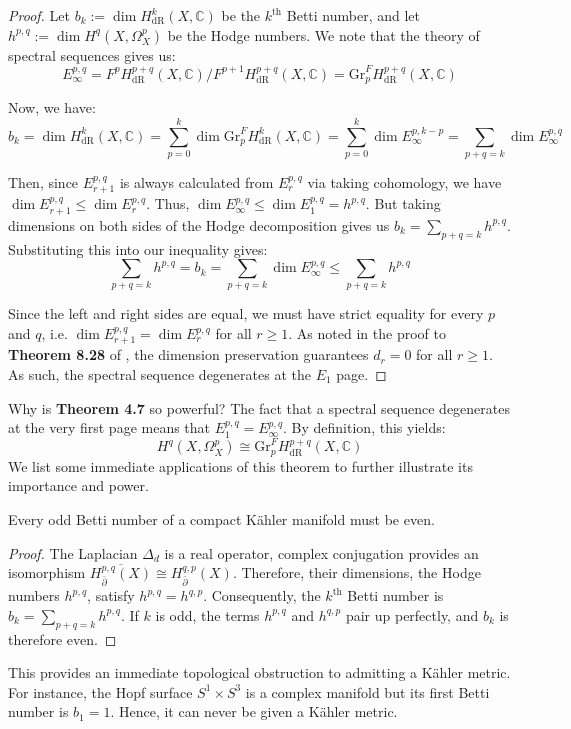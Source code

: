 \documentclass[11pt]{article}
\newcommand{\C}{\mathbb{C}}
\theoremstyle{definition}
\numberwithin{theorem}{section} %
\numberwithin{equation}{section} %
\begin{document}
\begin{proof}
        Let $b_k:=\dim H_\mathrm{dR}^k(X,\C)$ be the $k^\text{th}$ Betti number, and let $h^{p,q}:=\dim H^q\left(X,\Omega_X^p\right)$ be the Hodge numbers. We note that the theory of spectral sequences gives us:
        $$
        E_\infty^{p,q} = F^p H_\mathrm{dR}^{p+q}(X,\C) / F^{p+1} H_\mathrm{dR}^{p+q}(X,\C) = \mathrm{Gr}^F_p H_\mathrm{dR}^{p+q}(X,\C)
        $$
        
        \noindent Now, we have:
        $$
        b_k = \dim H_\mathrm{dR}^k(X,\C) = \sum_{p=0}^k\dim \mathrm{Gr}^F_p H_\mathrm{dR}^k(X,\C) = \sum_{p=0}^k\dim E^{p,k-p}_\infty = \sum_{p+q=k} \dim E_\infty^{p,q}
        $$
        
        \noindent Then, since $E_{r+1}^{p,q}$ is always calculated from $E_r^{p,q}$ via taking cohomology, we have $\dim E_{r+1}^{p,q} \leq \dim E_r^{p,q}$. Thus, $\dim E_\infty^{p,q} \leq \dim E_1^{p,q} = h^{p,q}$. But taking dimensions on both sides of the Hodge decomposition gives us $b_k = \sum_{p+q=k} h^{p,q}$. Substituting this into our inequality gives:
        $$
        \sum_{p+q=k} h^{p,q} = b_k = \sum_{p+q=k} \dim E_\infty^{p,q} \leq \sum_{p+q=k} h^{p,q}
        $$
        
        \noindent Since the left and right sides are equal, we must have strict equality for every $p$ and $q$, i.e. $\dim E_{r+1}^{p,q} = \dim E_r^{p,q}$ for all $r\geq 1$. As noted in the proof to \textbf{Theorem 8.28} of \cite{VoisinI2002}, the dimension preservation guarantees $d_r = 0$ for all $r\geq 1$. As such, the spectral sequence degenerates at the $E_1$ page.
\end{proof}

\noindent Why is \textbf{Theorem 4.7} so powerful? The fact that a spectral sequence degenerates at the very first page means that $E_1^{p,q} = E_\infty^{p,q}$. By definition, this yields:
$$
H^q\left(X,\Omega_X^p\right) \cong \mathrm{Gr}^F_p H^{p+q}_\mathrm{dR}(X,\C)
$$
We list some immediate applications of this theorem to further illustrate its importance and power. 

\begin{corollary}
    Every odd Betti number of a compact K\"ahler manifold must be even.
\end{corollary}

\begin{proof}
    The Laplacian $\Delta_d$ is a real operator, complex conjugation provides an isomorphism $\overline{H_{\bar{\partial}}^{p,q}(X)} \cong H_{\bar{\partial}}^{q,p}(X)$. Therefore, their dimensions, the Hodge numbers $h^{p,q}$, satisfy $h^{p,q} = h^{q,p}$. Consequently, the $k^\text{th}$ Betti number is $b_k = \sum_{p+q=k} h^{p,q}$. If $k$ is odd, the terms $h^{p,q}$ and $h^{q,p}$ pair up perfectly, and $b_k$ is therefore even.
\end{proof}
\noindent This provides an immediate topological obstruction to admitting a K\"ahler metric. For instance, the Hopf surface $S^1 \times S^3$ is a complex manifold but its first Betti number is $b_1=1$. Hence, it can never be given a K\"ahler metric.
\end{document}
